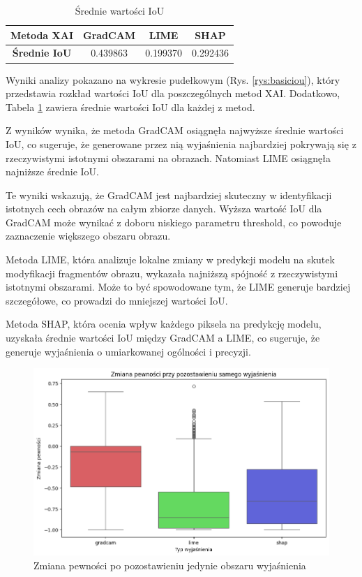\begin{table}
	\centering
	\begin{tabular}{|c|c|c|c|}
		\hline
		\textbf{Metoda XAI}  & GradCAM  & LIME     & SHAP     \\
		\hline
		\textbf{Średnie IoU} & 0.439863 & 0.199370 & 0.292436 \\
		\hline
	\end{tabular}
	\caption{Średnie wartości IoU}
	\label{tab:basiciou}
\end{table}

Wyniki analizy pokazano na wykresie pudełkowym (Rys. \ref{rys:basiciou}), który przedstawia rozkład wartości IoU dla poszczególnych metod XAI.
Dodatkowo, Tabela \ref{tab:basiciou} zawiera średnie wartości IoU dla każdej z metod.

Z wyników wynika, że metoda GradCAM osiągnęła najwyższe średnie wartości IoU, co sugeruje, że generowane przez nią wyjaśnienia najbardziej pokrywają się z rzeczywistymi istotnymi obszarami na obrazach.
Natomiast LIME osiągnęła najniższe średnie IoU.

Te wyniki wskazują, że GradCAM jest najbardziej skuteczny w identyfikacji istotnych cech obrazów na całym zbiorze danych.
Wyższa wartość IoU dla GradCAM może wynikać z doboru niskiego parametru threshold, co powoduje zaznaczenie większego obszaru obrazu.

Metoda LIME, która analizuje lokalne zmiany w predykcji modelu na skutek modyfikacji fragmentów obrazu, wykazała najniższą spójność z rzeczywistymi istotnymi obszarami.
Może to być spowodowane tym, że LIME generuje bardziej szczegółowe, co prowadzi do mniejszej wartości IoU.

Metoda SHAP, która ocenia wpływ każdego piksela na predykcję modelu, uzyskała średnie wartości IoU między GradCAM a LIME, co sugeruje, że generuje wyjaśnienia o umiarkowanej ogólności i precyzji.

\begin{figure}
	\centering\includegraphics[width=.6\textwidth]{img/base_confidence_exp}
	\caption{Zmiana pewności po pozostawieniu jedynie obszaru wyjaśnienia}  \label{rys:base_confidence_exp}
\end{figure}

